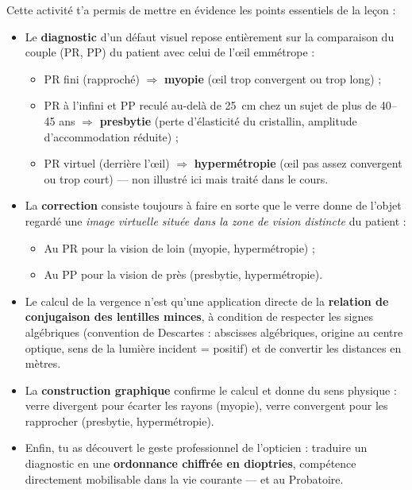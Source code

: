 \documentclass[11pt]{article}
\newcounter{popsec}
\newcounter{popsub}
\newcommand{\courssub}[1]{%
  \stepcounter{popsub}%
  \par\vspace{9pt}\noindent{\popxbold\fontsize{11.5}{13}\selectfont\color{popink}{\color{poporange}\thepopsec.\thepopsub}\hspace{6pt}#1}\par\nopagebreak\vspace{4pt}
}
\begin{document}
\courssub{Bilan de l'activité}

Cette activité t'a permis de mettre en évidence les points essentiels de la leçon :

\begin{itemize}
\item Le \textbf{diagnostic} d'un défaut visuel repose entièrement sur la comparaison du couple (PR, PP) du patient avec celui de l'œil emmétrope :
  \begin{itemize}
  \item PR fini (rapproché) $\Rightarrow$ \textbf{myopie} (œil trop convergent ou trop long) ;
  \item PR à l'infini et PP reculé au-delà de \SI{25}{cm} chez un sujet de plus de 40--45 ans $\Rightarrow$ \textbf{presbytie} (perte d'élasticité du cristallin, amplitude d'accommodation réduite) ;
  \item PR virtuel (derrière l'œil) $\Rightarrow$ \textbf{hypermétropie} (œil pas assez convergent ou trop court) — non illustré ici mais traité dans le cours.
  \end{itemize}
\item La \textbf{correction} consiste toujours à faire en sorte que le verre donne de l'objet regardé une \emph{image virtuelle située dans la zone de vision distincte} du patient :
  \begin{itemize}
  \item Au PR pour la vision de loin (myopie, hypermétropie) ;
  \item Au PP pour la vision de près (presbytie, hypermétropie).
  \end{itemize}
\item Le calcul de la vergence n'est qu'une application directe de la \textbf{relation de conjugaison des lentilles minces}, à condition de respecter les signes algébriques (convention de Descartes : abscisses algébriques, origine au centre optique, sens de la lumière incident = positif) et de convertir les distances en mètres.
\item La \textbf{construction graphique} confirme le calcul et donne du sens physique : verre divergent pour écarter les rayons (myopie), verre convergent pour les rapprocher (presbytie, hypermétropie).
\item Enfin, tu as découvert le geste professionnel de l'opticien : traduire un diagnostic en une \textbf{ordonnance chiffrée en dioptries}, compétence directement mobilisable dans la vie courante — et au Probatoire.
\end{itemize}
\end{document}
